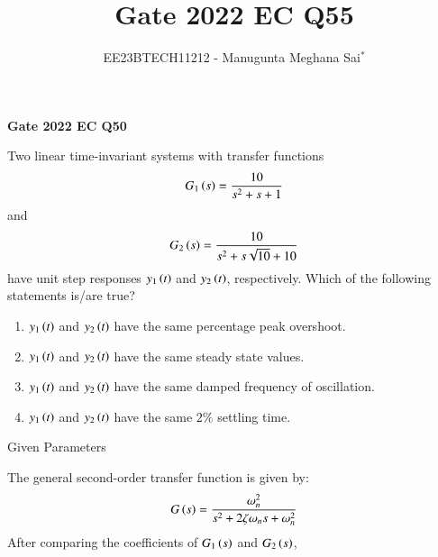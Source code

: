 \documentclass[journal,12pt,onecolumn]{IEEEtran}
\theoremstyle{remark}
\begin{document}
    
    
    \vspace{3cm}
    
    \title{Gate 2022 EC Q55}
    \author{EE23BTECH11212 - Manugunta Meghana Sai$^{*}$%
    }
    \maketitle
    \bigskip
    
    \renewcommand{\thefigure}{\theenumi}
    \renewcommand{\thetable}{\theenumi}
    
    \vspace{3cm}
    \textbf{Gate 2022 EC Q50} 
    
    Two linear time-invariant systems with transfer functions 
    \begin{align*}
    G_{1}\left(s\right) = \frac{10}{s^{2} + s + 1} 
    \end{align*}
    and
    \begin{align*}
    G_{2}\left(s\right) = \frac{10}{s^{2}+s\sqrt{10} +10}
    \end{align*}
    have unit step responses $y_{1}\left(t\right)$ and $y_{2}\left(t\right)$, respectively. Which of the following statements is/are true?
    \begin{enumerate}
    \item $y_{1}\left(t\right)$ and $y_{2}\left(t\right)$ have the same percentage peak overshoot.\\
    \item $y_{1}\left(t\right)$ and $y_{2}\left(t\right)$ have the same steady state values.\\
    \item $y_{1}\left(t\right)$ and $y_{2}\left(t\right)$ have the same damped frequency of oscillation.\\
    \item $y_{1}\left(t\right)$ and $y_{2}\left(t\right)$ have the same $2\%$ settling time.\\
    \end{enumerate}
    \solution
    \begin{table}[h!]
 	\centering
 	\resizebox{6 cm}{!}{
 		
 	}
 	\caption{Given Parameters}
 	\label{tab:msmECgate50tab1}
     \end{table} 
    The general second-order transfer function is given by:
    \begin{align}
    G\left(s\right) = \frac{\omega_n^2}{s^2 + 2\zeta\omega_n s + \omega_n^2}
    \end{align}
    After comparing the coefficients of $G_{1}\left(s\right)$ and $G_{2}\left(s\right)$,
\end{document}
